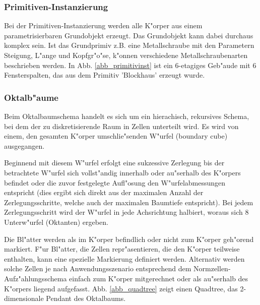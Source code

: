 {\subsubsection{Primitiven-Instanzierung}
{
\let\mywidth=\linewidth
\parbox[t]{0.6\mywidth}{%
    Bei der Primitiven-Instanzierung werden alle K"orper aus einem 
    parametrisierbaren Grundobjekt erzeugt. Das Grundobjekt kann dabei 
    durchaus komplex sein. Ist das Grundprimiv z.B. eine Metallschraube mit 
    den Parametern Steigung, L"ange und Kopfgr"o"se, k"onnen verschiedene 
    Metallschraubenarten beschrieben werden. In Abb.  
    \ref{abb_primitivinst} ist ein 6-etagiges Geb"aude mit  
    6 Fensterspalten, das aus dem Primitiv 
    'Blockhaus' erzeugt wurde.
}
\hspace{1em}
\parbox[t][4cm][c]{0.35\mywidth}{}


\subsubsection{Oktalb"aume}
\label{einf_octree}
{
\let\mywidth=\linewidth
\parbox[t]{0.65\mywidth}{%
    Beim Oktalbaumschema handelt es sich um ein hierachisch, rekursives 
    Schema, bei dem der zu diskretisierende Raum in Zellen unterteilt wird. 
    Es wird von einem, den gesamten K"orper umschlie"senden W"urfel 
    (boundary cube) ausgegangen. 

    Beginnend mit diesem W"urfel erfolgt eine sukzessive 
    Zerlegung bis der betrachtete W"urfel sich vollst"andig innerhalb oder 
    au"serhalb des K"orpers befindet oder die zuvor festgelegte Aufl"osung 
    den W"urfelabmessungen entspricht (dies ergibt sich direkt aus der 
    maximalen Anzahl der Zerlegungsschritte, welche auch der maximalen 
    Baumtiefe entspricht).
    Bei jedem Zerlegungsschritt wird der W"urfel in jede Achsrichtung 
    halbiert, woraus sich $8$ Unterw"urfel (Oktanten) ergeben. 
}
\hspace{1em}
\parbox[t][6cm][c]{0.3\mywidth}{}

Die Bl"atter werden als im K"orper befindlich oder nicht zum K"orper 
geh"orend markiert. 
F"ur Bl"atter, die Zellen repr"asentieren, die den K"orper teilweise 
enthalten, kann eine spezielle Markierung definiert werden. 
Alternativ werden solche Zellen je nach Anwendungsszenario entsprechend dem 
Normzellen-Aufz"ahlungsschema einfach zum K"orper mitgerechnet oder als 
au"serhalb des K"orpers liegend aufgefasst. Abb. \ref{abb_quadtree} 
zeigt einen Quadtree, das 2-dimensionale Pendant des Oktalbaums. 

}}}
